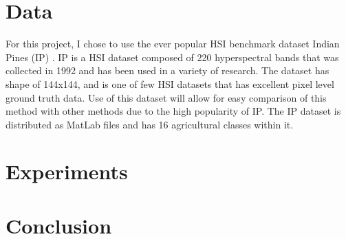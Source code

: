 \documentclass[12pt]{article}
\begin{document}
%
\section{Data}\label{sec:data}
For this project, I chose to use the ever popular HSI benchmark dataset Indian Pines (IP) \cite{IP}.
%
IP is a HSI dataset composed of 220 hyperspectral bands that was collected in 1992 and has been used in a variety of research.
%
The dataset has shape of 144x144, and is one of few HSI datasets that has excellent pixel level ground truth data.
%
Use of this dataset will allow for easy comparison of this method with other methods due to the high popularity of IP.
%
The IP dataset is distributed as MatLab files and has 16 agricultural classes within it.

%
\section{Experiments}\label{sec:experiments}

\section{Conclusion}\label{sec:conclusion}


\newpage
 

\end{document}
